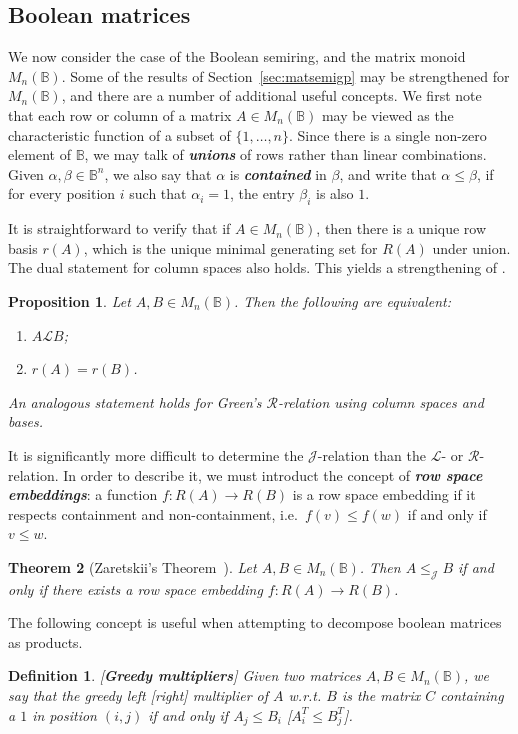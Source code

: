 \documentclass[11pt]{article}
\newtheorem{thm}{Theorem}[section]
\newtheorem{prop}[thm]{Proposition}
\newtheorem*{defi}{Definition}
\newenvironment{de}{\begin{defi}\rm}{\end{defi}}
\newcommand{\defn}[1]{\textbf{\textit{#1}}}
\numberwithin{equation}{section}
\renewcommand{\to}{\longrightarrow}
\newcommand{\B}{\mathbb{B}}
\newcommand{\Bn}{M_n(\B)}
\renewcommand{\L}{\mathscr{L}}
\newcommand{\R}{\mathscr{R}}
\newcommand{\J}{\mathscr{J}}
\begin{document}
\subsection{Boolean matrices}

We now consider the case of the Boolean semiring, and the matrix monoid $\Bn$.
Some of the results of Section~\ref{sec:matsemigp} may be strengthened for
$\Bn$, and there are a number of additional useful concepts.
We first note that each row or column of a matrix $A \in \Bn$ may be viewed
as the characteristic function of a subset of $\{1, \ldots, n\}$. Since there is
a single non-zero element of $\B$, we may talk of \defn{unions} of rows rather
than linear combinations. Given $\alpha, \beta \in \B^n$, we also say that
$\alpha$ is \defn{contained} in $\beta$, and write that $\alpha \leq \beta$, if
for every position $i$ such that $\alpha_i = 1$, the entry $\beta_i$ is also
$1$. 

It is straightforward to verify that if $A \in \Bn$, then there is a unique row
basis $r(A)$, which is the unique minimal generating set for $R(A)$ under
union. The dual statement for column spaces also holds. This yields a
strengthening of .

\begin{prop} 
  Let $A, B \in \Bn$. Then the following are equivalent:
  \begin{enumerate}[label=\roman*]
    \item 
      $A \L B$;
    \item 
      $r(A) = r(B)$.
  \end{enumerate}
  An analogous statement holds for Green's $\R$-relation using column spaces
  and bases. 
\end{prop}

It is significantly more difficult to determine the $\J$-relation than the $\L$-
or $\R$-relation. In order to describe it, we must introduct the concept of
\defn{row space embeddings}: a function $f: R(A) \to R(B)$ is a row space
embedding if it respects containment and non-containment, i.e.\ $f(v) \leq f(w)$
if and only if $v \leq w$.
\begin{thm}[Zaretskii's Theorem~\cite{Zaretskii1963aa}]
  Let $A, B \in \Bn$. Then $A \leq_{\J} B$ if and only if there exists a row
  space embedding $f: R(A) \to R(B)$.
\end{thm}

The following concept is useful when attempting to decompose boolean matrices as
products.
\begin{de}[\textbf{Greedy multipliers}]
  Given two matrices $A, B \in \Bn$, we say that the \emph{greedy
  left [right] multiplier} of $A$ w.r.t. $B$ is the matrix $C$ containing a $1$
  in position $(i, j)$ if and only if $A_j \leq B_i$ [$A^T_i \leq B^T_j$].
\end{de}
\end{document}
